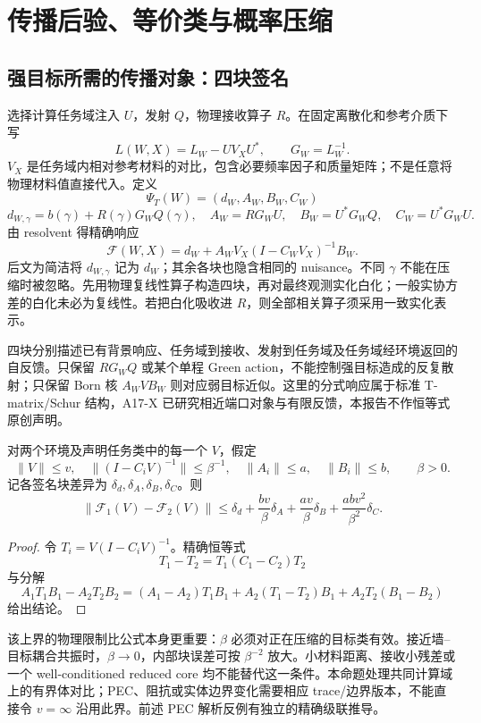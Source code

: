 \section{传播后验、等价类与概率压缩}
\subsection{强目标所需的传播对象：四块签名}
选择计算任务域注入 $U$，发射 $Q$，物理接收算子 $R$。在固定离散化和参考介质下写
\[
L(W,X)=L_W-U V_XU^*,\qquad G_W=L_W^{-1}.
\]
$V_X$ 是任务域内相对参考材料的对比，包含必要频率因子和质量矩阵；不是任意将物理材料值直接代入。定义
\[
\boxed{\Psi_T(W)=(d_W,A_W,B_W,C_W)}
\]
\[
d_{W,\gamma}=b(\gamma)+R(\gamma)G_WQ(\gamma),\quad A_W=RG_WU,\quad
B_W=U^*G_WQ,\quad C_W=U^*G_WU.
\]
由 resolvent 得精确响应
\[
\boxed{\mathcal F(W,X)=
d_W+A_W V_X(I-C_WV_X)^{-1}B_W.}
\]
后文为简洁将 $d_{W,\gamma}$ 记为 $d_W$；其余各块也隐含相同的 nuisance。不同 $\gamma$ 不能在压缩时被忽略。先用物理复线性算子构造四块，再对最终观测实化白化；一般实协方差的白化未必为复线性。若把白化吸收进 $R$，则全部相关算子须采用一致实化表示。

四块分别描述已有背景响应、任务域到接收、发射到任务域及任务域经环境返回的自反馈。只保留 $RG_WQ$ 或某个单程 Green action，不能控制强目标造成的反复散射；只保留 Born 核 $A_W V B_W$ 则对应弱目标近似。这里的分式响应属于标准 T-matrix/Schur 结构，A17-X 已研究相近端口对象与有限反馈，本报告不作恒等式原创声明。\cite{L_Tmatrix,R_A17X}

\begin{proposition}[强目标传播误差的条件上界]
对两个环境及声明任务类中的每一个 $V$，假定
\[
\|V\|\le v,\quad\|(I-C_iV)^{-1}\|\le\beta^{-1},\quad
\|A_i\|\le a,\quad \|B_i\|\le b,\qquad \beta>0.
\]
记各签名块差异为 $\delta_d,\delta_A,\delta_B,\delta_C$。则
\[
\boxed{\|\mathcal F_1(V)-\mathcal F_2(V)\|
\le \delta_d+\frac{bv}{\beta}\delta_A+
\frac{av}{\beta}\delta_B+
\frac{abv^2}{\beta^2}\delta_C.}
\]
\end{proposition}
\begin{proof}
令 $T_i=V(I-C_iV)^{-1}$。精确恒等式
\[
T_1-T_2=T_1(C_1-C_2)T_2
\]
与分解
\[
A_1T_1B_1-A_2T_2B_2
=(A_1-A_2)T_1B_1+A_2(T_1-T_2)B_1+
A_2T_2(B_1-B_2)
\]
给出结论。
\end{proof}
该上界的物理限制比公式本身更重要：$\beta$ 必须对正在压缩的目标类有效。接近墙--目标耦合共振时，$\beta\to0$，内部块误差可按 $\beta^{-2}$ 放大。小材料距离、接收小残差或一个 well-conditioned reduced core 均不能替代这一条件。本命题处理共同计算域上的有界体对比；PEC、阻抗或实体边界变化需要相应 trace/边界版本，不能直接令 $v=\infty$ 沿用此界。前述 PEC 解析反例有独立的精确级联推导。

